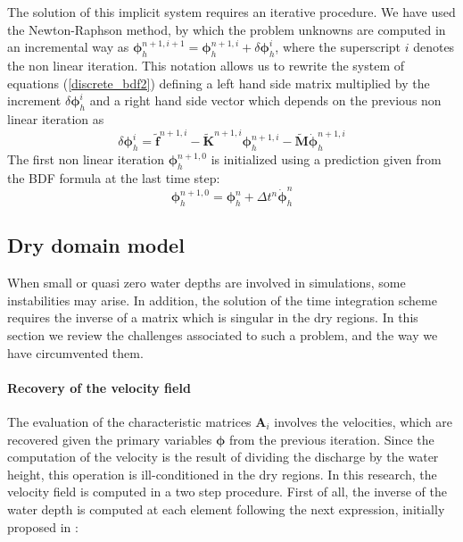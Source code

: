 The solution of this implicit system requires an iterative procedure. We have used the Newton-Raphson method, by which the problem unknowns are computed in an incremental way as
$\bm{\phi}_h^{n+1,i+1} = \bm{\phi}_h^{n+1,i} + \delta\bm{\phi}_h^i$,
where the superscript $i$ denotes the non linear iteration.
This notation allows us to rewrite the system of equations (\ref{discrete_bdf2}) defining a left hand side matrix multiplied by the increment $\delta\bm{\phi}_h^i$ and a right hand side vector which depends on the previous non linear iteration as
\begin{equation}
[\beta_0\tilde{\mathbf{M}} + \tilde{\mathbf{K}}^{n+1,i}] \delta\bm{\phi}_h^i
= \tilde{\mathbf{f}}^{n+1,i} - \tilde{\mathbf{K}}^{n+1,i}\bm{\phi}_h^{n+1,i} - \tilde{\mathbf{M}}\dot{\bm{\phi}}_h^{n+1,i}
\end{equation}
The first non linear iteration $\bm{\phi}_h^{n+1,0}$ is initialized using a prediction given from the BDF formula at the last time step:
\begin{equation}
\bm{\phi}_h^{n+1,0} = \bm{\phi}_h^n + \Delta t^n \dot{\bm{\phi}}_h^{n}
\end{equation}


\subsection{Dry domain model}

When small or quasi zero water depths are involved in simulations, some instabilities may arise. In addition, the solution of the time integration scheme requires the inverse of a matrix which is singular in the dry regions. In this section we review the challenges associated to such a problem, and the way we have circumvented them.

\paragraph{Recovery of the velocity field}
The evaluation of the characteristic matrices $\mathbf{A}_i$ involves the velocities, which are recovered given the primary variables $\bm{\phi}$ from the previous iteration.
Since the computation of the velocity is the result of dividing
the discharge by the water height, this operation is ill-conditioned in the dry regions. In this research, the velocity field is computed in a two step procedure. First of all, the inverse of the water depth is computed at each element following the next expression, initially proposed in \cite{kurganov2007}:

